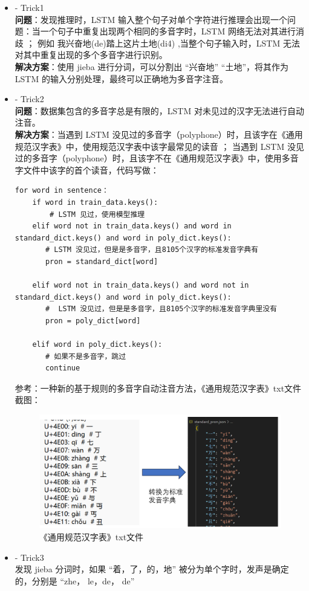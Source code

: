 \documentclass[12pt,hyperref,a4paper,UTF8]{ctexart}
\begin{document}
\begin{itemize}
  \item - Trick1 \\
  \textbf{问题}：发现推理时，LSTM 输入整个句子对单个字符进行推理会出现一个问题：当一个句子中重复出现两个相同的多音字时，LSTM 网络无法对其进行消歧 ； 例如 我兴奋地(de)踏上这片土地(di4) ,当整个句子输入时，LSTM 无法对其中重复出现的多个多音字进行识别。\\
  \textbf{解决方案}：使用 jieba 进行分词，可以分割出 “兴奋地” “土地”，将其作为 LSTM 的输入分别处理，最终可以正确地为多音字注音。
  \item - Trick2 \\
  \textbf{问题}：数据集包含的多音字总是有限的，LSTM 对未见过的汉字无法进行自动注音。\\
  \textbf{解决方案}：当遇到 LSTM 没见过的多音字（polyphone）时，且该字在《通用规范汉字表》中，使用规范汉字表中该字最常见的读音 ； 当遇到 LSTM 没见过的多音字（polyphone）时，且该字不在《通用规范汉字表》中，使用多音字文件中该字的首个读音，代码写做：
  \begin{lstlisting}[caption={Trick2实现代码}, label={lst:example}]
for word in sentence：
    if word in train_data.keys():
        # LSTM 见过，使用模型推理
    elif word not in train_data.keys() and word in standard_dict.keys() and word in poly_dict.keys():
       # LSTM 没见过，但是是多音字，且8105个汉字的标准发音字典有
       pron = standard_dict[word]

    elif word not in train_data.keys() and word not in standard_dict.keys() and word in poly_dict.keys():
       #  LSTM 没见过，但是是多音字，且8105个汉字的标准发音字典里没有
       pron = poly_dict[word]
       
    elif word in poly_dict.keys():
       # 如果不是多音字，跳过
       continue
\end{lstlisting}
参考：一种新的基于规则的多音字自动注音方法，《通用规范汉字表》txt文件截图：
\begin{figure}[H]
    \centering
    \includegraphics[width=0.5\linewidth]{figures/image6.png}
    \caption{《通用规范汉字表》txt文件}
    \label{fig:img6}
\end{figure}
  \item - Trick3 \\
  发现 jieba 分词时，如果 “着，了，的，地” 被分为单个字时，发声是确定的，分别是 “zhe， le，de， de”
\end{itemize}
\end{document}
